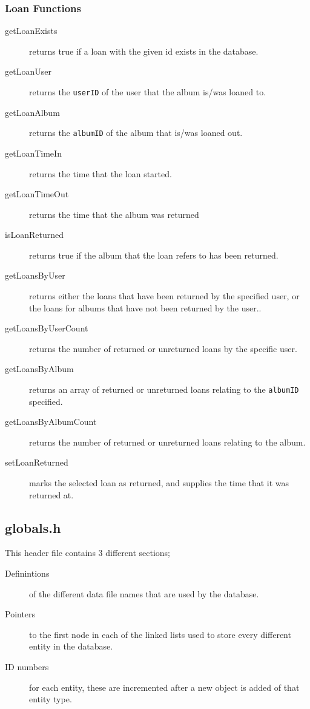 \documentclass{article}
\begin{document}
\subsubsection{Loan Functions}
\begin{description}
\item[getLoanExists] returns true if a loan with the given id exists in the database.
\item[getLoanUser] returns the \verb|userID| of the user that the album is/was loaned to.
\item[getLoanAlbum] returns the \verb|albumID| of the album that is/was loaned out.
\item[getLoanTimeIn] returns the time that the loan started.
\item[getLoanTimeOut] returns the time that the album was returned 
\item[isLoanReturned] returns true if the album that the loan refers to has been returned.
\item[getLoansByUser] returns either the loans that have been returned by the specified user, or the loans for albums that have not been returned by the user..
\item[getLoansByUserCount] returns the number of returned or unreturned loans by the specific user.
\item[getLoansByAlbum] returns an array of returned or unreturned loans relating to the \verb|albumID| specified. 
\item[getLoansByAlbumCount] returns the number of returned or unreturned loans relating to the album.
\item[setLoanReturned] marks the selected loan as returned, and supplies the time that it was returned at.
\end{description}

\subsection{globals.h}
This header file contains 3 different sections;
\begin{description}
\item[Definintions] of the different data file names that are used by the database.
\item[Pointers] to the first node in each of the linked lists used to store every different entity in the database.
\item[ID numbers] for each entity, these are incremented after a new object is added of that entity type.
\end{description}
\end{document}
